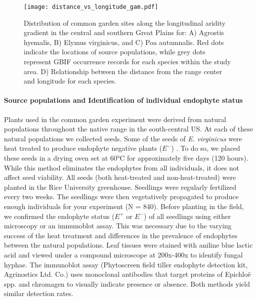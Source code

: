\documentclass[12pt]{article}\usepackage[]{graphicx}\usepackage[dvipsnames]{xcolor}
\begin{document}
\begin{figure}[H]
\centering
\texttt{[image: distance\_vs\_longitude\_gam.pdf]}
\caption{Distribution of common garden sites along the longitudinal aridity gradient in the central and southern Great Plains for: A) Agrostis hyemalis, B) Elymus virginicus, and C) Poa autumnalis. Red dots indicate the locations of source populations, while grey dots represent GBIF occurrence records for each species within the study area. D) Relationship between the distance from the range center and longitude for each species.}
\label{sup:md}
\end{figure}


\paragraph {Source populations and Identification of individual endophyte status} 
Plants used  in the common garden experiment were derived from natural populations throughout the native range in the south-central US. 
At each of these natural populations we collected seeds. 
Some of the seeds of \emph{E. virginicus} were heat treated to produce endophyte negative plants ($E^-$) . 
To do so, we placed these seeds  in a drying oven set at 60°C for approximately five days (120 hours). 
While this method eliminates the endophytes from all individuals, it does not affect seed viability. 
All seeds (both heat-treated and non-heat-treated) were planted in the Rice University greenhouse.
Seedlings were regularly fertilized every two weeks. 
The seedlings were then vegetatively propagated to produce enough individuals for your experiment (N = 840).
Before planting in the field, we confirmed the endophyte status ($E^+$ or $E^-$) of all  seedlings using either microscopy or an immunoblot assay. 
This was necessary due to the varying success of the heat treatment and differences in the prevalence of endophytes between the natural populations. 
Leaf tissues were stained with aniline blue lactic acid and viewed under a compound microscope at 200x-400x to identify fungal hyphae. 
The immunoblot assay (Phytoscreen field tiller endophyte detection kit, Agrinostics Ltd. Co.) uses monoclonal antibodies that target proteins of Epichloë spp. and chromagen to visually indicate presence or absence. Both methods yield similar detection rates.  
\end{document}
